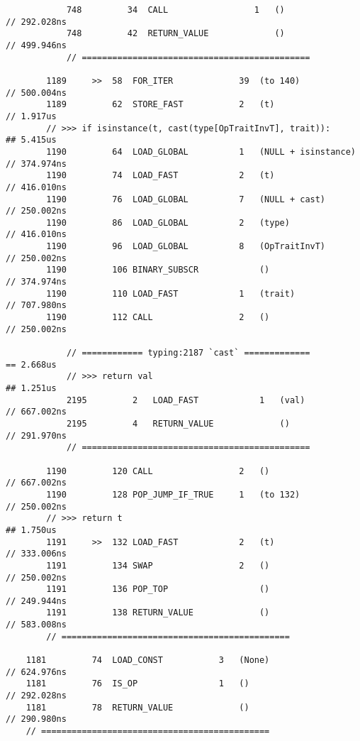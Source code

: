 \begin{code}
\begin{verbatim}
            748         34  CALL                 1   ()                         // 292.028ns
            748         42  RETURN_VALUE             ()                         // 499.946ns
            // =============================================

        1189     >>  58  FOR_ITER             39  (to 140)                      // 500.004ns
        1189         62  STORE_FAST           2   (t)                           // 1.917us
        // >>> if isinstance(t, cast(type[OpTraitInvT], trait)):                ## 5.415us
        1190         64  LOAD_GLOBAL          1   (NULL + isinstance)           // 374.974ns
        1190         74  LOAD_FAST            2   (t)                           // 416.010ns
        1190         76  LOAD_GLOBAL          7   (NULL + cast)                 // 250.002ns
        1190         86  LOAD_GLOBAL          2   (type)                        // 416.010ns
        1190         96  LOAD_GLOBAL          8   (OpTraitInvT)                 // 250.002ns
        1190         106 BINARY_SUBSCR            ()                            // 374.974ns
        1190         110 LOAD_FAST            1   (trait)                       // 707.980ns
        1190         112 CALL                 2   ()                            // 250.002ns

            // ============ typing:2187 `cast` =============                    == 2.668us
            // >>> return val                                                   ## 1.251us
            2195         2   LOAD_FAST            1   (val)                     // 667.002ns
            2195         4   RETURN_VALUE             ()                        // 291.970ns
            // =============================================

        1190         120 CALL                 2   ()                            // 667.002ns
        1190         128 POP_JUMP_IF_TRUE     1   (to 132)                      // 250.002ns
        // >>> return t                                                         ## 1.750us
        1191     >>  132 LOAD_FAST            2   (t)                           // 333.006ns
        1191         134 SWAP                 2   ()                            // 250.002ns
        1191         136 POP_TOP                  ()                            // 249.944ns
        1191         138 RETURN_VALUE             ()                            // 583.008ns
        // =============================================

    1181         74  LOAD_CONST           3   (None)                            // 624.976ns
    1181         76  IS_OP                1   ()                                // 292.028ns
    1181         78  RETURN_VALUE             ()                                // 290.980ns
    // =============================================


\end{verbatim}
\end{code}
